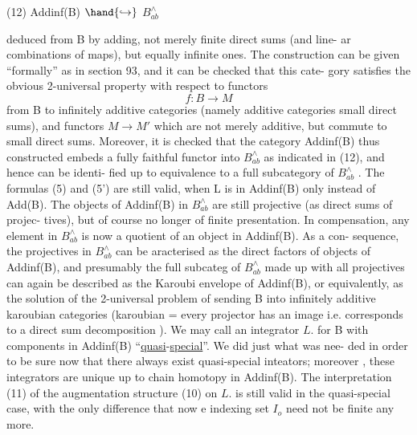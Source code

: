 
(12) \qquad Addinf(B) $\hand{\hookrightarrow}$ $B^{\wedge}_{ab}$

deduced from B  by adding, not merely finite direct sums (and line-%
ar combinations of maps), but equally infinite ones. The construction can
be given ``formally'' as in section 93, and it can be checked that this cate-%
gory satisfies the obvious 2-universal property with respect to functors
\[ f : B \longrightarrow M \]
from B to infinitely additive  categories (namely additive categories
 small direct sums), and functors $M \rightarrow M'$ which 
are not merely additive, but commute to small direct sums. Moreover, it
is checked that the category Addinf(B) thus constructed embeds  a fully
faithful functor into $B^{\wedge}_{ab}$ as indicated in (12), and hence can be identi-%
fied up to equivalence to a full subcategory of $B^{\wedge}_{ab}$ . The formulas (5) and
(5') are still valid, when L is in Addinf(B) only instead of Add(B). The
objects of Addinf(B) in $B^{\wedge}_{ab}$ are still projective (as direct sums of projec-%
tives), but of course no longer of finite presentation. In compensation,
any element in $B^{\wedge}_{ab}$ is now a quotient of an object in Addinf(B). As a con-%
sequence, the projectives in $B^{\wedge}_{ab}$ can be aracterised as the direct factors
of  objects of Addinf(B), and presumably the full subcateg
of $B^{\wedge}_{ab}$ made up with all projectives can again be described as the Karoubi
envelope of Addinf(B), or equivalently, as the  solution of
the 2-universal problem of sending B into infinitely additive karoubian
categories (karoubian = every projector has an image \over{\unsure{;}}{\unsure{,}} i.e. corresponds
to a direct sum decomposition ). We may call an integrator $L.$ for B
with components in Addinf(B) ``\uline{quasi}-\uline{special}''. We did just what was nee-%
ded in order to be sure now that there  always exist 
quasi-special inteators; moreover , these integrators are
unique up to chain homotopy in Addinf(B). The interpretation (11) of the
augmentation structure (10) on $L.$ is still valid in the quasi-special
case, with the only difference that now e indexing set $I_{o}$ need not be
finite any more.

